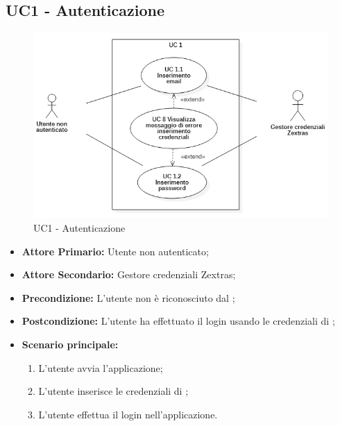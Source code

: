 \subsection{UC1 - Autenticazione}
\begin{figure}[H]
    \centering
    \includegraphics[scale = 0.7]{components/img/UC1.png}
    \caption{UC1 - Autenticazione}
\end{figure}
\begin{itemize}
\item \textbf{Attore Primario:} Utente non autenticato;
\item \textbf{Attore Secondario:} Gestore credenziali Zextras;
\item \textbf{Precondizione:} L'utente non è riconosciuto dal ;
\item \textbf{Postcondizione:} L'utente ha effettuato il login usando le credenziali di ;
\item \textbf{Scenario principale:}
    \begin{enumerate}
    \item L'utente avvia l'applicazione;
    \item L'utente inserisce le credenziali di ;
    \item L'utente effettua il login nell'applicazione.
    \end{enumerate}
\end{itemize}
